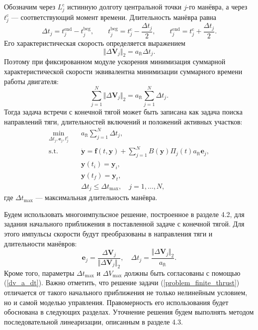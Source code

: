 Обозначим через $L_j^\text{c}$ истинную долготу центральной точки $j$-го манёвра, а через $t_j^\text{c}$ --- соответствующий момент времени. Длительность манёвра равна
\begin{equation}
    \Delta t_j = t_j^{\text{end}} - t_j^{\text{beg}}, \quad \quad
    t_j^{\text{beg}} = t_j^\text{c} - \frac{\Delta t_j}{2}, \quad \quad
    t_j^{\text{end}} = t_j^\text{c} + \frac{\Delta t_j}{2}.
\end{equation}
Его характеристическая скорость определяется выражением
\begin{equation}
    \Vert \Delta \mathbf{V}_j \Vert_2 = a_{\text{ft}} \Delta t_j.
\label{dv_a_dt}
\end{equation}
Поэтому при фиксированном модуле ускорения минимизация суммарной характеристической скорости эквивалентна минимизации суммарного времени работы двигателя:
\begin{equation}
    \sum_{j=1}^N \Vert \Delta \mathbf{V}_j \Vert_2 = a_{\text{ft}} \sum_{j=1}^N \Delta t_j.
\end{equation}
Тогда задача встречи с конечной тягой может быть записана как задача поиска направлений тяги, длительностей включений и положений активных участков:
\begin{equation}
\begin{aligned}
    \min_{\Delta t_j, \mathbf{e}_j, t_j^\text{c}} \quad &a_{\text{ft}} \sum_{j=1}^N \Delta t_j, \\
    \text{s.t.} \quad &\dot{\mathbf{y}} = \mathbf{f}(t, \mathbf{y}) + \sum_{j=1}^{N} B(\mathbf{y}) \Pi_j(t) a_{\text{ft}} \mathbf{e}_j, \\
    &\mathbf{y}(t_i) = \mathbf{y}_i, \\
    &\mathbf{y}(t_f) = \mathbf{y}_t, \\
    &\Delta t_j \leq \Delta t_{\text{max}}, \quad j = 1, \dots, N,
\end{aligned}
\label{problem_finite_thrust}
\end{equation}
где $\Delta t_{\text{max}}$ --- максимальная длительность манёвра. 

Будем использовать многоимпульсное решение, построенное в разделе 4.2, для задания начального приближения в поставленной задаче с конечной тягой. Для этого импульсы скорости будут преобразованы в направления тяги и длительности манёвров:
\begin{equation}
    \mathbf{e}_j = \frac{\Delta \mathbf{V}_j}{\Vert \Delta \mathbf{V}_j \Vert_2}, \quad
    \Delta t_j = \frac{\Vert \Delta \mathbf{V}_j \Vert_2}{a_\text{ft}}.
\end{equation}
Кроме того, параметры $\Delta t_{\text{max}}$ и $\Delta V_{\text{max}}$ должны быть согласованы с помощью (\ref{dv_a_dt}). Важно отметить, что решение задачи (\ref{problem_finite_thrust}) отличается от такого начального приближения не только нелинейным условием, но и самой моделью управления. Правомерность его использования будет обоснована в следующих разделах. Уточнение решения будем выполнять методом последовательной линеаризации, описанным в разделе 4.3. 


